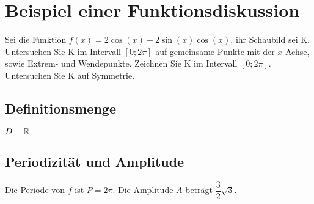 \section{Beispiel einer Funktionsdiskussion}
Sei die Funktion $f(x)=2\cos(x)+2\sin(x)\cos(x)$, ihr Schaubild sei K.\\
Untersuchen Sie K im Intervall $[0;2\pi]$ auf gemeinsame Punkte mit der $x$-Achse, sowie Extrem- und Wendepunkte. Zeichnen Sie K im Intervall $[0;2\pi]$. Untersuchen Sie K auf Symmetrie.

\subsection{Definitionsmenge}
  $D=\mathbb{R}$

\subsection{Periodizität und Amplitude}
Die Periode von $f$ ist $P=2\pi$. Die Amplitude $A$ beträgt $\dfrac{3}{2}\sqrt{3}$.
\\

